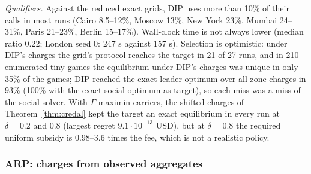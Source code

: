\documentclass[preprint,11pt]{elsarticle}
\theoremstyle{definition}
\theoremstyle{remark}
\begin{document}
\emph{Qualifiers.} Against the reduced exact grids, DIP uses more than 10\% of their calls in most runs (Cairo 8.5--12\%, Moscow 13\%, New York 23\%, Mumbai 24--31\%, Paris 21--23\%, Berlin 15--17\%). Wall-clock time is not always lower (median ratio 0.22; London seed 0: 247 s against 157 s). Selection is optimistic: under DIP's charges the grid's protocol reaches the target in 21 of 27 runs, and in 210 enumerated tiny games the equilibrium under DIP's charges was unique in only 35\% of the games; DIP reached the exact leader optimum over all zone charges in 93\% (100\% with the exact social optimum as target), so each miss was a miss of the social solver. With $\Gamma$-maximin carriers, the shifted charges of Theorem~\ref{thm:credal} kept the target an exact equilibrium in every run at $\delta=0.2$ and $0.8$ (largest regret $9.1\cdot10^{-13}$ USD), but at $\delta=0.8$ the required uniform subsidy is 0.98--3.6 times the fee, which is not a realistic policy.

\subsubsection{ARP: charges from observed aggregates}\label{sec:res-arp}
\end{document}
